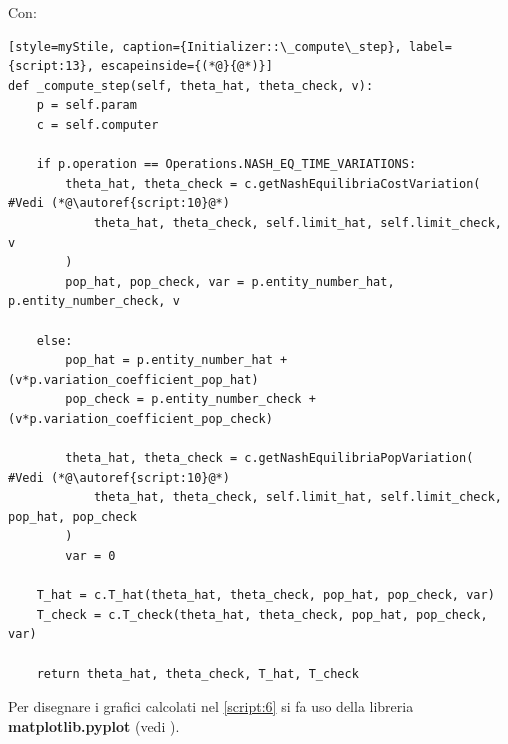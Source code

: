 Con:
\begin{lstlisting}[style=myStile, caption={Initializer::\_compute\_step}, label={script:13}, escapeinside={(*@}{@*)}]
def _compute_step(self, theta_hat, theta_check, v):
    p = self.param
    c = self.computer

    if p.operation == Operations.NASH_EQ_TIME_VARIATIONS:
        theta_hat, theta_check = c.getNashEquilibriaCostVariation(  #Vedi (*@\autoref{script:10}@*)
            theta_hat, theta_check, self.limit_hat, self.limit_check, v
        )
        pop_hat, pop_check, var = p.entity_number_hat, p.entity_number_check, v

    else:
        pop_hat = p.entity_number_hat + (v*p.variation_coefficient_pop_hat)
        pop_check = p.entity_number_check + (v*p.variation_coefficient_pop_check)

        theta_hat, theta_check = c.getNashEquilibriaPopVariation(   #Vedi (*@\autoref{script:10}@*)
            theta_hat, theta_check, self.limit_hat, self.limit_check, pop_hat, pop_check
        )
        var = 0

    T_hat = c.T_hat(theta_hat, theta_check, pop_hat, pop_check, var)
    T_check = c.T_check(theta_hat, theta_check, pop_hat, pop_check, var)

    return theta_hat, theta_check, T_hat, T_check
\end{lstlisting}

Per disegnare i grafici calcolati nel \autoref{script:6} si fa uso della libreria \textbf{matplotlib.pyplot} (vedi \cite{matplotlib_docs}).

